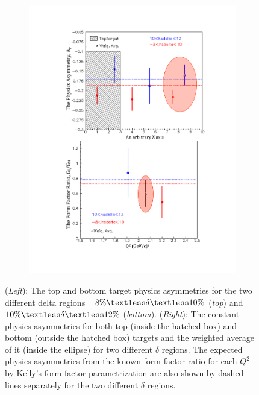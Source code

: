 \documentclass[12pt]{article}
\begin{document}
\begin{figure}[htbp]
\begin{subfigure}[htbp]{0.5\textwidth}
               \includegraphics[width=\textwidth]{apsingletb}
                \label{apsingletb}
        \end{subfigure}    
\caption{(\emph{Left}): The top and bottom target physics asymmetries for the two different delta regions $-8\% \textless \delta \textless 10\%$ (\emph{top}) and $10\% \textless \delta \textless 12\%$ (\emph{bottom}). 
(\emph{Right}): The constant physics asymmetries for both top (inside the hatched box) and bottom (outside the hatched box) targets and the weighted average of it (inside the ellipse) for two different $\delta$ regions. The expected physics asymmetries from the known form factor ratio for each $Q^2$ by Kelly's form factor parametrization \cite{99} are also shown by dashed lines separately for the two different $\delta$ regions.}
\label{apsinglearm}                  
\end{figure}
\end{document}
